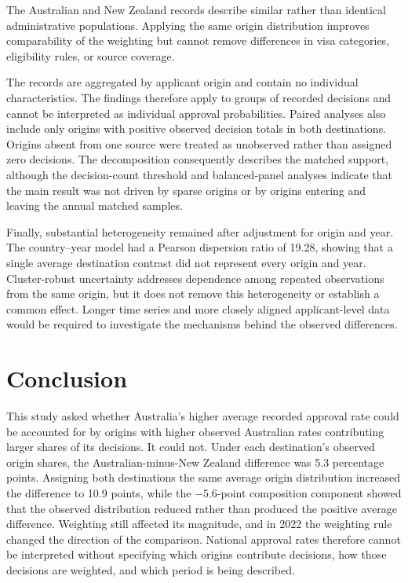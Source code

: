 \documentclass[runningheads]{llncs}
\begin{document}
The Australian and New Zealand records describe similar rather than identical administrative populations. Applying the same origin distribution improves comparability of the weighting but cannot remove differences in visa categories, eligibility rules, or source coverage.

The records are aggregated by applicant origin and contain no individual characteristics. The findings therefore apply to groups of recorded decisions and cannot be interpreted as individual approval probabilities. Paired analyses also include only origins with positive observed decision totals in both destinations. Origins absent from one source were treated as unobserved rather than assigned zero decisions. The decomposition consequently describes the matched support, although the decision-count threshold and balanced-panel analyses indicate that the main result was not driven by sparse origins or by origins entering and leaving the annual matched samples.

Finally, substantial heterogeneity remained after adjustment for origin and year. The country--year model had a Pearson dispersion ratio of 19.28, showing that a single average destination contrast did not represent every origin and year. Cluster-robust uncertainty addresses dependence among repeated observations from the same origin, but it does not remove this heterogeneity or establish a common effect. Longer time series and more closely aligned applicant-level data would be required to investigate the mechanisms behind the observed differences.

\section{Conclusion}

This study asked whether Australia's higher average recorded approval rate could be accounted for by origins with higher observed Australian rates contributing larger shares of its decisions. It could not. Under each destination's observed origin shares, the Australian-minus-New Zealand difference was 5.3 percentage points. Assigning both destinations the same average origin distribution increased the difference to 10.9 points, while the $-5.6$-point composition component showed that the observed distribution reduced rather than produced the positive average difference. Weighting still affected its magnitude, and in 2022 the weighting rule changed the direction of the comparison. National approval rates therefore cannot be interpreted without specifying which origins contribute decisions, how those decisions are weighted, and which period is being described.
\end{document}
